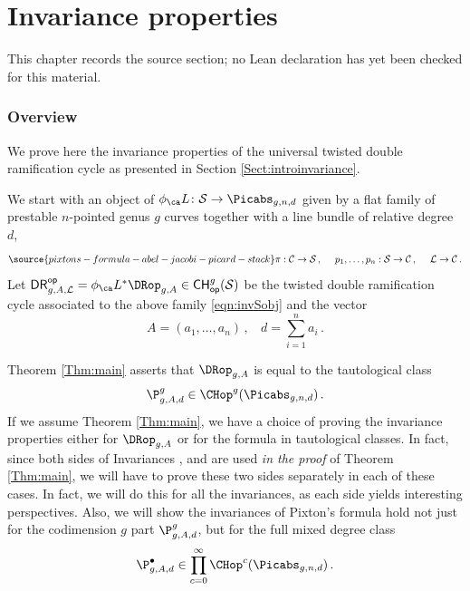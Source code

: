 \chapter{Invariance properties}
\label{pixtons-formula-abel-jacobi-picard-stack-chapter-08}

\begin{remark}
\label{pixtons-formula-abel-jacobi-picard-stack-chapter-08-source}
This chapter records the source section; no Lean declaration has yet been checked for this material.
\notready
\end{remark}

\label{Sect:proofInvariance}
\subsection{Overview}
We prove here the invariance properties of the universal twisted double ramification cycle as presented in Section \ref{Sect:introinvariance}.

We start with an object of $\phi_\ca L\colon \mathcal S \to \Picabs_{g,n,d}$
given by
a flat family of prestable $n$-pointed genus $g$ curves together with a line bundle of relative degree $d$,
    \begin{equation}
    \label{eqn:invSobj}
\source{pixtons-formula-abel-jacobi-picard-stack}
    \pi:\mathcal{C} \rightarrow \mathcal{S}\, , \ \ \ \ p_1,\ldots,p_n: \mathcal{S} \rightarrow \mathcal{C}\, , \ \ \ \
        \mathcal{L} \rightarrow \mathcal{C}\, .
        \end{equation}
    Let $\mathsf{DR}^{\mathsf{op}}_{g,A,\mathcal{L}}= \phi_\ca L^*\DRop_{g,A}\in \mathsf{CH}^g_{\mathsf{op}}(\mathcal{S})$
    be the twisted double ramification cycle associated to the above
    family \eqref{eqn:invSobj} and
     the vector
    $$A=(a_1,\ldots, a_n)\, , \ \ \ \ d =\sum_{i=1}^n a_i\, .$$


Theorem \ref{Thm:main} asserts that  $\DRop_{g,A}$ is equal to
the tautological class
$$\P^g_{g,A,d} \in \CHop^g(\Picabs_{g,n,d})\, .$$ If we
assume Theorem \ref{Thm:main}, we have a choice of proving the invariance properties either for $\DRop_{g,A}$ or for the formula in tautological classes. In fact, since both
sides of Invariances \invnrn, \invnrA{} and
\invnrIV{} are used {\em in the proof} of Theorem \ref{Thm:main},
we will have to prove these two sides separately in each of these cases.
In fact, we will do this for all the invariances, as each side yields interesting perspectives. Also, we will show the invariances of Pixton's formula hold
not just for
the codimension $g$ part $\P^g_{g,A,d}$, but for the full mixed degree class
\[\P^\bullet_{g,A,d} \in \prod_{c=0}^\infty \CHop^c(\Picabs_{g,n,d})\, .\]

